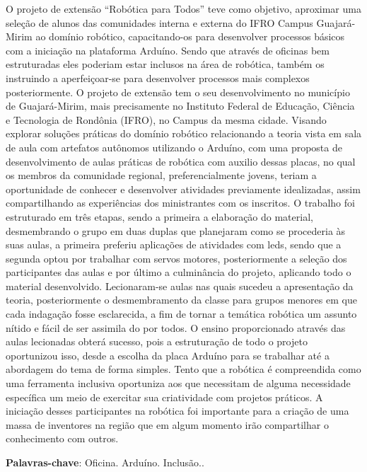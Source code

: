 \documentclass[article,12pt,onesidea,4paper,english,brazil]{abntex2}
\begin{document}
	\noindent O projeto de extensão “Robótica para Todos” teve como objetivo, aproximar uma seleção de alunos das comunidades interna e externa do IFRO Campus Guajará-Mirim ao domínio robótico, capacitando-os para desenvolver processos básicos com a iniciação na plataforma Arduíno. Sendo que através de oficinas bem estruturadas eles poderiam estar inclusos na área de robótica, também os instruindo a aperfeiçoar-se para desenvolver processos mais complexos posteriormente. O projeto de extensão tem o seu desenvolvimento no município de Guajará-Mirim, mais precisamente no Instituto Federal de Educação, Ciência e Tecnologia de Rondônia (IFRO), no Campus da mesma cidade. Visando explorar soluções práticas do domínio robótico relacionando a teoria vista em sala de aula com artefatos autônomos utilizando o Arduíno, com uma proposta de desenvolvimento de aulas práticas de robótica com auxilio dessas placas, no qual os membros da comunidade regional,   preferencialmente	jovens,   teriam a   oportunidade   de
	conhecer	e desenvolver	atividades	previamente	idealizadas,	assim 	compartilhando as experiências dos ministrantes com os inscritos. O trabalho foi estruturado em três etapas, sendo a primeira a elaboração do material, desmembrando o grupo em duas duplas que planejaram como se procederia às suas aulas, a primeira preferiu aplicações de atividades com leds, sendo que a segunda optou por trabalhar com servos motores, posteriormente a seleção dos participantes das aulas e por último a culminância do projeto, aplicando todo o material desenvolvido. Lecionaram-se aulas nas quais sucedeu a apresentação da teoria, posteriormente o desmembramento da classe para grupos menores em que cada indagação fosse esclarecida, a fim de tornar a temática robótica um assunto nítido e fácil de ser assimila do por todos. O ensino proporcionado através das aulas lecionadas obterá sucesso, pois a estruturação de todo o projeto oportunizou isso, desde a escolha da placa Arduíno para se trabalhar até a abordagem do tema de forma simples. Tento que a robótica é compreendida como uma ferramenta inclusiva oportuniza aos que necessitam de alguma necessidade específica um meio de exercitar sua criatividade com projetos práticos. A iniciação desses participantes na robótica foi importante para a criação de uma massa de inventores na região que em algum momento irão compartilhar o conhecimento com outros.
	
	
	\vspace{\onelineskip}
	
	\noindent
	\textbf{Palavras-chave}: Oficina. Arduíno. Inclusão..
	
\end{document}

